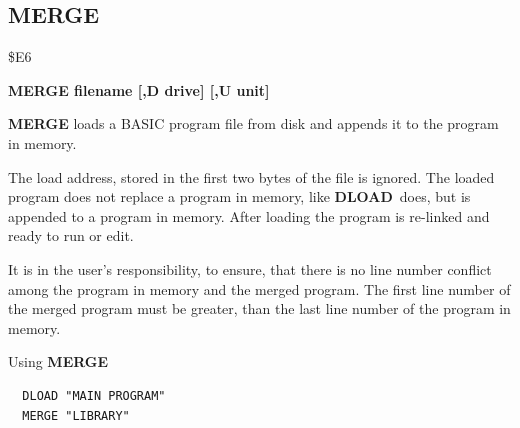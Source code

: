 \subsection{MERGE}
\begin{description}[leftmargin=2cm,style=nextline]
\item [Token:] \$E6
\item [Format:] {\bf MERGE filename [,D drive] [,U unit] }
\item [Usage:] {\bf MERGE} loads a BASIC program file from disk
               and appends it to the program in memory.

   \filenamedefinition

   \drivedefinition

   \unitdefinition

\item [Remarks:]
   The load address, stored in the first two bytes
   of the file is ignored. The loaded program does not
   replace a program in memory, like {\bf DLOAD} does,
   but is appended to a program in memory.
   After loading the program is re-linked
   and ready to run or edit.

   It is in the user's responsibility, to ensure, that there
   is no line number conflict among the program in memory and
   the merged program. The first line number of the merged
   program must be greater, than the last line number of the
   program in memory.

\item [Example:] Using {\bf MERGE}
\begin{tcolorbox}[colback=black,coltext=white]
\verbatimfont{\codefont}
\begin{verbatim}
  DLOAD "MAIN PROGRAM"
  MERGE "LIBRARY"
\end{verbatim}
\end{tcolorbox}
\end{description}


\newpage
